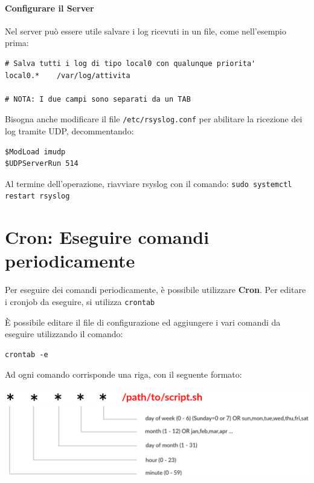 \documentclass[a4paper]{report}
\newenvironment{ricordati}{\begin{tcolorbox}[fonttitle=\sffamily\bfseries\large,title=Ricordati,colframe=orange!75!white]}{\end{tcolorbox}}
\newenvironment{code}{\begin{tcolorbox}[size=small]}{\end{tcolorbox}}
\begin{document}
\subsubsection{Configurare il Server}

Nel server può essere utile salvare i log ricevuti in un file, come nell'esempio prima:

\begin{code}
\begin{lstlisting}
# Salva tutti i log di tipo local0 con qualunque priorita'
local0.*	/var/log/attivita

# NOTA: I due campi sono separati da un TAB
\end{lstlisting}
\end{code}

Bisogna anche modificare il file \texttt{/etc/rsyslog.conf} per abilitare la ricezione dei log tramite UDP, decommentando:

\begin{code}
\begin{lstlisting}
$ModLoad imudp
$UDPServerRun 514
\end{lstlisting}
\end{code}

\begin{ricordati}
	Al termine dell'operazione, riavviare rsyslog con il comando: \texttt{sudo systemctl restart rsyslog}
\end{ricordati}

\chapter{Cron: Eseguire comandi periodicamente}

Per eseguire dei comandi periodicamente, è possibile utilizzare \textbf{Cron}. Per editare i cronjob da eseguire, si utilizza \texttt{crontab}

È possibile editare il file di configurazione ed aggiungere i vari comandi da eseguire utilizzando il comando:
\begin{code}
\begin{lstlisting}
crontab -e
\end{lstlisting}
\end{code}

Ad ogni comando corrisponde una riga, con il seguente formato:

\begin{center}
	\includegraphics[width=0.8\linewidth]{crontab}
\end{center}
\end{document}
